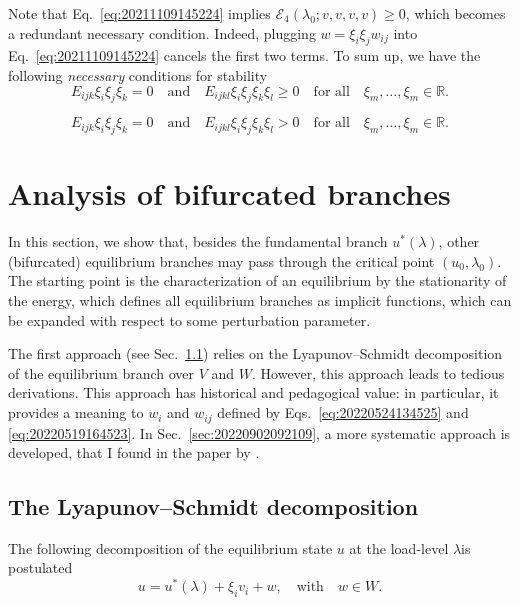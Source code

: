 \documentclass[12pt, final]{scrartcl}
\theoremstyle{definition}
\newcommand{\E}{\mathcal E}
\newcommand{\reals}{\mathbb{R}}
\begin{document}
Note that Eq.~\eqref{eq:20211109145224} implies $\E_4(\lambda_0; v, v, v, v) ≥ 0$,
which becomes a redundant necessary condition. Indeed, plugging
$w= ξ_i ξ_j w_{ij}$ into Eq.~\eqref{eq:20211109145224} cancels the first two
terms. To sum up, we have the following \emph{necessary} conditions for
stability
\begin{equation}
  E_{ijk} ξ_i ξ_j ξ_k = 0 \quad \text{and} \quad E_{ijkl} ξ_i ξ_j ξ_k ξ_l ≥ 0 \quad \text{for all} \quad ξ_m, \ldots, ξ_m \in \reals.
\end{equation}

\begin{equation}
  E_{ijk} ξ_i ξ_j ξ_k = 0 \quad \text{and} \quad E_{ijkl} ξ_i ξ_j ξ_k ξ_l > 0 \quad \text{for all} \quad ξ_m, \ldots, ξ_m \in \reals.
\end{equation}

\section{Analysis of bifurcated branches}
\label{sec:20220617075558}

In this section, we show that, besides the fundamental branch $u^\ast(\lambda)$,
other (bifurcated) equilibrium branches may pass through the critical point
$(u_0, \lambda_0)$. The starting point is the characterization of an equilibrium by
the stationarity of the energy, which defines all equilibrium branches as
implicit functions, which can be expanded with respect to some perturbation
parameter.

The first approach (see Sec.~\ref{sec:20220902091527}) relies on the
Lyapunov–Schmidt decomposition of the equilibrium branch over $V$ and
$W$. However, this approach leads to tedious derivations. This approach has
historical and pedagogical value: in particular, it provides a meaning to
$w_i$ and $w_{ij}$ defined by Eqs.~\eqref{eq:20220524134525} and
\eqref{eq:20220519164523}. In Sec.~\ref{sec:20220902092109}, a more systematic
approach is developed, that I found in the paper by \textcite[][Appendix
A]{chak2018}.

\subsection{The Lyapunov–Schmidt decomposition}
\label{sec:20220902091527}

The following decomposition of the equilibrium state $u$ at the load-level
$\lambda$is postulated
\begin{equation}
  \label{eq:20220902174235}
  u = u^\ast(\lambda) + ξ_i v_i + w, \quad \text{with} \quad w \in W.
\end{equation}
\end{document}
